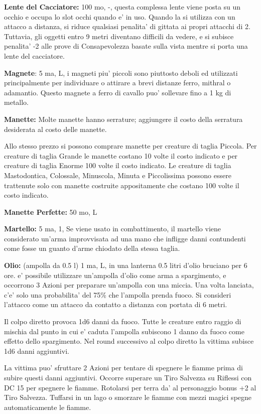 \documentclass[a4paper,11pt,twoside,openany]{book}
\begin{document}
{		\textbf{Lente del Cacciatore:} 100 mo, -, questa complessa lente viene posta su un occhio e occupa lo slot occhi quando e' in uso. Quando la si utilizza con un attacco a distanza, si riduce qualsiasi penalita' di gittata ai propri attacchi di 2. Tuttavia, gli oggetti entro 9 metri diventano difficili da vedere, e si subisce penalita' -2 alle prove di Consapevolezza basate sulla vista mentre si porta una lente del cacciatore.
		
		\textbf{Magnete}: 5 ma, L, i magneti piu' piccoli sono piuttosto deboli ed utilizzati principalmente per individuare o attirare a brevi distanze ferro, mithral o adamantio. Questo magnete a ferro di cavallo puo' sollevare fino a 1 kg di metallo. 
		
		\textbf{Manette:} Molte manette hanno serrature; aggiungere il costo della serratura desiderata al costo delle manette.
		
		Allo stesso prezzo si possono comprare manette per creature di taglia Piccola. Per creature di taglia Grande le manette costano 10 volte il costo indicato e per creature di taglia Enorme 100 volte il costo indicato. Le creature di taglia Mastodontica, Colossale, Minuscola, Minuta e Piccolissima possono essere trattenute solo con manette costruite appositamente che costano 100 volte il costo indicato.
		
		\textbf{Manette Perfette:} 50 mo, L
		
		\textbf{Martello:} 5 ma, 1, Se viene usato in combattimento, il martello viene considerato un'arma improvvisata ad una mano che infligge danni contundenti come fosse un guanto d'arme chiodato della stessa taglia.
		
		\textbf{Olio:} (ampolla da 0.5 l) 1 ma, L, in una lanterna 0.5 litri d'olio bruciano per 6 ore. e' possibile utilizzare un'ampolla d'olio come arma a spargimento, e occorrono 3 Azioni per preparare un'ampolla con una miccia. Una volta lanciata, c'e' solo una probabilita' del 75\% che l'ampolla prenda fuoco. Si consideri l'attacco come un attacco da contatto a distanza con portata di 6 metri.
		
		Il colpo diretto provoca 1d6 danni da fuoco. Tutte le creature entro raggio di mischia dal punto in cui e' caduta l'ampolla subiscono 1 danno da fuoco come effetto dello spargimento. Nel round successivo al colpo diretto la vittima subisce 1d6 danni aggiuntivi.
		
		La vittima puo' sfruttare 2 Azioni per tentare di spegnere le fiamme prima di subire questi danni aggiuntivi. Occorre superare un Tiro Salvezza su Riflessi con DC 15 per spegnere le fiamme. Rotolarsi per terra da' al personaggio bonus +2 al Tiro Salvezza. 
		Tuffarsi in un lago o smorzare le fiamme con mezzi magici spegne automaticamente le fiamme.
		
}
\end{document}
